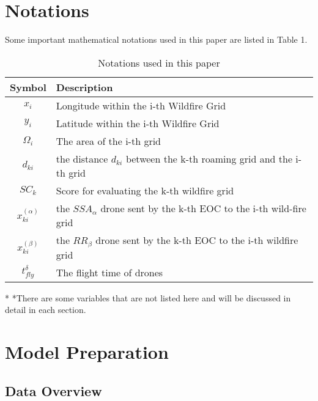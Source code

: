 \documentclass[12pt]{article}  %
\begin{document}
\section{Notations}%
Some important mathematical notations used in this paper are listed in Table 1. 
\begin{table}[htbp]
\begin{center}
\caption{Notations used in this paper}
\begin{tabular}{c l}
\toprule[2pt]
\multicolumn{1}{m{3cm}}{\centering Symbol}
&\multicolumn{1}{m{8cm}}{\centering Description }\\
\midrule
$x_i$& Longitude within the i-th Wildfire Grid \\
$y_i$& Latitude within the i-th Wildfire Grid \\
$\varOmega _i$& The area of the i-th grid\\
$d_{ki}$& the distance $d_{ki}$ between the k-th roaming grid and the i-th grid \\
$SC_k$ & Score for evaluating the k-th wildfire grid \\
\vspace{5pt}%
$x^{( \alpha )}_{ki}$ & the $SSA_\alpha$ drone sent by the k-th EOC to the i-th wild-fire grid\\
\vspace{3pt}
$x^{( \beta )}_{ki}$ & the $RR_\beta$ drone sent by the k-th EOC to the i-th wildfire grid\\
$t_{fly}^{\delta}$ & The flight time of drones\\
\bottomrule[2pt]
\end{tabular}\label{tb:notation}
 \begin{tablenotes}
        \footnotesize
        \item[*] *There are some variables that are not listed here and will be discussed in detail in each section. %
      \end{tablenotes}
\end{center}
\end{table}
\vspace{-1cm}%

\section{Model Preparation} %
\subsection{Data Overview} %
\end{document}
